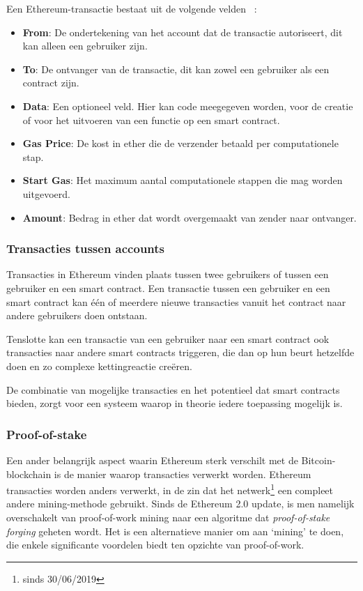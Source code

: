 		Een Ethereum-transactie bestaat uit de volgende velden ~\autocite{Buterin2014}:
		\begin{itemize}
			\item \textbf{From}: De ondertekening van het account dat de transactie autoriseert, dit kan alleen een gebruiker zijn.
			\item \textbf{To}: De ontvanger van de transactie, dit kan zowel een gebruiker als een contract zijn. 
			\item \textbf{Data}: Een optioneel veld. Hier kan code meegegeven worden, voor de creatie of voor het uitvoeren van een functie op een smart contract. 
			\item \textbf{Gas Price}: De kost in ether die de verzender betaald per computationele stap.
			\item \textbf{Start Gas}: Het maximum aantal computationele stappen die mag worden uitgevoerd.
			\item \textbf{Amount}: Bedrag in ether dat wordt overgemaakt van zender naar ontvanger.
		\end{itemize}	
		\subsubsection{Transacties tussen accounts}
		Transacties in Ethereum vinden plaats tussen twee gebruikers of tussen een gebruiker en een smart contract. Een transactie tussen een gebruiker en een smart contract kan één of meerdere nieuwe transacties vanuit het contract naar andere gebruikers doen ontstaan. ~\autocite{Buterin2014}
		
		Tenslotte kan een transactie van een gebruiker naar een smart contract ook transacties naar andere smart contracts triggeren, die dan op hun beurt hetzelfde doen en zo complexe kettingreactie creëren. ~\autocite{Buterin2014}
		
		De combinatie van mogelijke transacties en het potentieel dat smart contracts bieden, zorgt voor een systeem waarop in theorie iedere toepassing mogelijk is. ~\autocite{Wood2017}
		\subsubsection{Proof-of-stake}
			Een ander belangrijk aspect waarin Ethereum sterk verschilt met de Bitcoin-blockchain is de manier waarop transacties verwerkt worden. Ethereum transacties worden anders verwerkt, in de zin dat het netwerk\footnote{sinds 30/06/2019} een compleet andere mining-methode gebruikt. Sinds de Ethereum 2.0 update, is men namelijk overschakelt van proof-of-work mining naar een algoritme dat \textit{proof-of-stake forging} geheten wordt. Het is een alternatieve manier om aan `mining' te doen, die enkele significante voordelen biedt ten opzichte van proof-of-work. 
		
